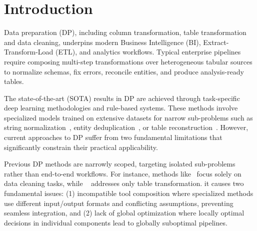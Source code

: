 \section{Introduction}
\label{sec:intro}

% 

Data preparation (DP), including column transformation, table transformation and data cleaning, underpins modern Business Intelligence (BI), Extract-Transform-Load (ETL), and analytics workflows. Typical enterprise pipelines require composing multi-step transformations over heterogeneous tabular sources to normalize schemas, fix errors, reconcile entities, and produce analysis-ready tables.

 The state-of-the-art (SOTA) results in DP are achieved through task-specific deep learning methodologies and rule-based systems. These methods involve specialized models trained on extensive datasets for narrow sub-problems such as string normalization~\cite{DBLP:journals/pvldb/LiYLFT25}, entity deduplication~\cite{DBLP:conf/icde/FanHFC00024}, or table reconstruction~\cite{yang2021auto}. However, current approaches to DP suffer from two fundamental limitations that significantly constrain their practical applicability.

 Previous DP methods are narrowly scoped, targeting isolated sub-problems rather than end-to-end workflows. For instance, methods like~\cite{DBLP:journals/pvldb/LiYLFT25, DBLP:conf/icde/FanHFC00024} focus solely on data cleaning tasks, while ~\cite{yang2021auto} addresses only table transformation. it causes two fundamental issues: (1) incompatible tool composition where specialized methods use different input/output formats and conflicting assumptions, preventing seamless integration, and (2) lack of global optimization where locally optimal decisions in individual components lead to globally suboptimal pipelines. 


